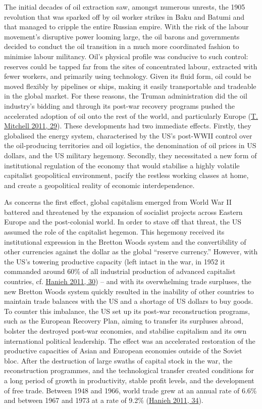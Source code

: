 \documentclass[a4paper, nobind]{templates/ociamthesis}
\begin{document}
The initial decades of oil extraction saw, amongst numerous unrests, the 1905 revolution that was sparked off by oil worker strikes in Baku and Batumi and that managed to cripple the entire Russian empire. With the risk of the labour movement's disruptive power looming large, the oil barons and governments decided to conduct the oil transition in a much more coordinated fashion to minimise labour militancy. Oil's physical profile was conducive to such control: reserves could be tapped far from the sites of concentrated labour, extracted with fewer workers, and primarily using technology. Given its fluid form, oil could be moved flexibly by pipelines or ships, making it easily transportable and tradeable in the global market. For these reasons, the Truman administration did the oil industry's bidding and through its post-war recovery programs pushed the accelerated adoption of oil onto the rest of the world, and particularly Europe (\protect\hyperlink{ref-mitchell_carbon_2011}{T. Mitchell 2011, 29}). These developments had two immediate effects. Firstly, they globalised the energy system, characterised by the US's post-WWII control over the oil-producing territories and oil logistics, the denomination of oil prices in US dollars, and the US military hegemony. Secondly, they necessitated a new form of institutional regulation of the economy that would stabilise a highly volatile capitalist geopolitical environment, pacify the restless working classes at home, and create a geopolitical reality of economic interdependence.

As concerns the first effect, global capitalism emerged from World War II battered and threatened by the expansion of socialist projects across Eastern Europe and the post-colonial world. In order to stave off that threat, the US assumed the role of the capitalist hegemon. This hegemony received its institutional expression in the Bretton Woods system and the convertibility of other currencies against the dollar as the global ``reserve currency.'' However, with the US's towering productive capacity (left intact in the war, in 1952 it commanded around 60\% of all industrial production of advanced capitalist countries, cf. \protect\hyperlink{ref-hanieh_capitalism_2011}{Hanieh 2011, 30}) -- and with its overwhelming trade surpluses, the new Bretton Woods system quickly resulted in the inability of other countries to maintain trade balances with the US and a shortage of US dollars to buy goods. To counter this imbalance, the US set up its post-war reconstruction programs, such as the European Recovery Plan, aiming to transfer its surpluses abroad, bolster the destroyed post-war economies, and stabilise capitalism and its own international political leadership. The effect was an accelerated restoration of the productive capacities of Asian and European economies outside of the Soviet bloc. After the destruction of large swaths of capital stock in the war, the reconstruction programmes, and the technological transfer created conditions for a long period of growth in productivity, stable profit levels, and the development of free trade. Between 1948 and 1966, world trade grew at an annual rate of 6.6\% and between 1967 and 1973 at a rate of 9.2\% (\protect\hyperlink{ref-hanieh_capitalism_2011}{Hanieh 2011, 34}).
\end{document}
